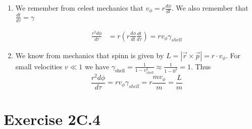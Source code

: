 \documentclass[a4paper,10pt,english]{article}
\begin{document}
\begin{enumerate}
\item We remember from celest mechanics that $v_{\phi}=r\frac{d\phi}{dt}$. We also remember that $\frac{dt}{d\tau}=\gamma$

\begin{align*}
\frac{r^{2}d\phi}{d\tau}&=r\left(r\frac{d\phi}{dt}\frac{dt}{d\tau}\right)=rv_{\phi}\gamma_{shell}
\end{align*}

\item We know from mechanics that spinn is given by $L=|\vec{r}\times\vec{p}|=r\cdot v_{\phi}$. For small velocities $v\ll1$ we have $\gamma_{\text{shell}}=\frac{1}{1-v_{shell}^{2}}\approx\frac{1}{1-0^{2}}=1$. Thus \[\frac{r^{2}d\phi}{d\tau}=rv_{\phi}\gamma_{shell}=r\frac{mv_{\phi}}{m}=\frac{L}{m}\]
 
\end{enumerate}








\section*{Exercise 2C.4}
\end{document}
